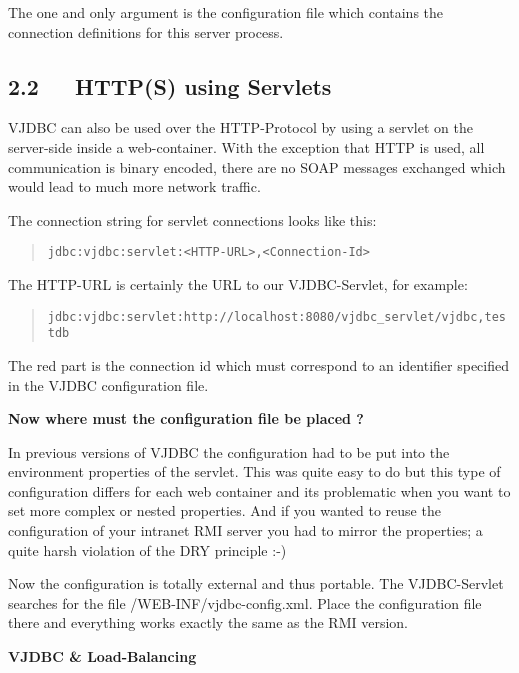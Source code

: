 \documentclass[10pt,a4paper,english]{article}
\begin{document}
The one and only argument is the configuration file which contains the connection definitions for this server process.



\hypertarget{http-s-using-servlets}{}
\subsection*{2.2~~~HTTP(S) using Servlets}

VJDBC can also be used over the HTTP-Protocol by using a servlet on the server-side inside a web-container. With the exception that HTTP is used, all communication is binary encoded, there are no SOAP messages exchanged which would lead to much more network traffic.

The connection string for servlet connections looks like this:
\begin{quote}

\texttt{jdbc:vjdbc:servlet:<HTTP-URL>,<Connection-Id>}
\end{quote}

The HTTP-URL is certainly the URL to our VJDBC-Servlet, for example:
\begin{quote}

\texttt{jdbc:vjdbc:servlet:http://localhost:8080/vjdbc{\_}servlet/vjdbc,testdb}
\end{quote}

The red part is the connection id which must correspond to an identifier specified in the VJDBC configuration file.

\textbf{Now where must the configuration file be placed ?}

In previous versions of VJDBC the configuration had to be put into the environment properties of the servlet. This was quite easy to do but this type of configuration differs for each web container and its problematic when you want to set more complex or nested properties. And if you wanted to reuse the configuration of your intranet RMI server you had to mirror the properties; a quite harsh violation of the DRY principle :-)

Now the configuration is totally external and thus portable. The VJDBC-Servlet searches for the file /WEB-INF/vjdbc-config.xml. Place the configuration file there and everything works exactly the same as the RMI version.

\textbf{VJDBC {\&} Load-Balancing}
\end{document}
